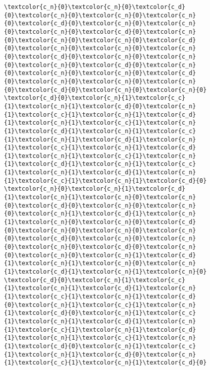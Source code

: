 \begin{figure}[!h]
\centering
\begin{BVerbatim}[commandchars=\\\{\},codes={\catcode`=3\catcode`^=7\catcode`_=8}]
\textcolor{c_n}{0}\textcolor{c_n}{0}\textcolor{c_d}{0}\textcolor{c_n}{0}\textcolor{c_n}{0}\textcolor{c_n}{0}\textcolor{c_d}{0}\textcolor{c_n}{0}\textcolor{c_n}{0}\textcolor{c_n}{0}\textcolor{c_d}{0}\textcolor{c_n}{0}\textcolor{c_n}{0}\textcolor{c_n}{0}\textcolor{c_d}{0}\textcolor{c_n}{0}\textcolor{c_n}{0}\textcolor{c_n}{0}\textcolor{c_d}{0}\textcolor{c_n}{0}\textcolor{c_n}{0}\textcolor{c_n}{0}\textcolor{c_d}{0}\textcolor{c_n}{0}\textcolor{c_n}{0}\textcolor{c_n}{0}\textcolor{c_d}{0}\textcolor{c_n}{0}\textcolor{c_n}{0}\textcolor{c_n}{0}\textcolor{c_d}{0}\textcolor{c_n}{0}\textcolor{c_n}{0}
\textcolor{c_d}{0}\textcolor{c_n}{1}\textcolor{c_c}{1}\textcolor{c_n}{1}\textcolor{c_d}{0}\textcolor{c_n}{1}\textcolor{c_c}{1}\textcolor{c_n}{1}\textcolor{c_d}{1}\textcolor{c_n}{1}\textcolor{c_c}{1}\textcolor{c_n}{1}\textcolor{c_d}{1}\textcolor{c_n}{1}\textcolor{c_c}{1}\textcolor{c_n}{1}\textcolor{c_d}{1}\textcolor{c_n}{1}\textcolor{c_c}{1}\textcolor{c_n}{1}\textcolor{c_d}{1}\textcolor{c_n}{1}\textcolor{c_c}{1}\textcolor{c_n}{1}\textcolor{c_d}{1}\textcolor{c_n}{1}\textcolor{c_c}{1}\textcolor{c_n}{1}\textcolor{c_d}{1}\textcolor{c_n}{1}\textcolor{c_c}{1}\textcolor{c_n}{1}\textcolor{c_d}{0}
\textcolor{c_n}{0}\textcolor{c_n}{1}\textcolor{c_d}{1}\textcolor{c_n}{1}\textcolor{c_n}{0}\textcolor{c_n}{0}\textcolor{c_d}{0}\textcolor{c_n}{0}\textcolor{c_n}{0}\textcolor{c_n}{1}\textcolor{c_d}{1}\textcolor{c_n}{1}\textcolor{c_n}{0}\textcolor{c_n}{0}\textcolor{c_d}{0}\textcolor{c_n}{0}\textcolor{c_n}{0}\textcolor{c_n}{0}\textcolor{c_d}{0}\textcolor{c_n}{0}\textcolor{c_n}{0}\textcolor{c_n}{0}\textcolor{c_d}{0}\textcolor{c_n}{0}\textcolor{c_n}{0}\textcolor{c_n}{1}\textcolor{c_d}{1}\textcolor{c_n}{1}\textcolor{c_n}{0}\textcolor{c_n}{1}\textcolor{c_d}{1}\textcolor{c_n}{1}\textcolor{c_n}{0}
\textcolor{c_d}{0}\textcolor{c_n}{1}\textcolor{c_c}{1}\textcolor{c_n}{1}\textcolor{c_d}{1}\textcolor{c_n}{1}\textcolor{c_c}{1}\textcolor{c_n}{1}\textcolor{c_d}{0}\textcolor{c_n}{1}\textcolor{c_c}{1}\textcolor{c_n}{1}\textcolor{c_d}{0}\textcolor{c_n}{1}\textcolor{c_c}{1}\textcolor{c_n}{1}\textcolor{c_d}{1}\textcolor{c_n}{1}\textcolor{c_c}{1}\textcolor{c_n}{1}\textcolor{c_d}{1}\textcolor{c_n}{1}\textcolor{c_c}{1}\textcolor{c_n}{1}\textcolor{c_d}{0}\textcolor{c_n}{1}\textcolor{c_c}{1}\textcolor{c_n}{1}\textcolor{c_d}{0}\textcolor{c_n}{1}\textcolor{c_c}{1}\textcolor{c_n}{1}\textcolor{c_d}{0}

\end{BVerbatim}
\end{figure}
